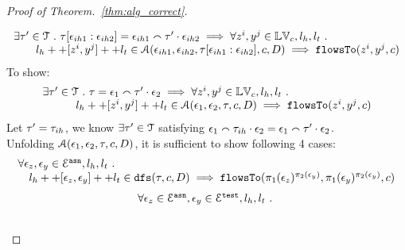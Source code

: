 \begin{proof}[Proof of Theorem.~\ref{thm:alg_correct}]
\begin{case}
\[\begin{array}{l}
   \exists \mathtt{\tau}' \in \mathcal{T} ~.~ 
   \mathtt{\tau}[\mathtt{\epsilon}_{ih1}:\mathtt{\epsilon}_{ih2}] = \mathtt{\epsilon}_{ih1} \smallfrown \mathtt{\tau}' \cdot \mathtt{\epsilon}_{ih2}
   \implies 
   \forall z^i, y^j \in \mathbb{LV}_c, l_h, l_t ~.~ 
    \\ \qquad 
   l_h ++ [z^i, y^j] ++ l_t  \in \mathcal{A}(\mathtt{\epsilon}_{ih1}, \mathtt{\epsilon}_{ih2}, \mathtt{\tau}[\mathtt{\epsilon}_{ih1}:\mathtt{\epsilon}_{ih2}], c, D)
   \implies \mathtt{flowsTo}(z^i, y^j, c)
\end{array}
\]
%
To show:
\[
\begin{array}{l}
    \exists \mathtt{\tau}' \in \mathcal{T} ~.~ \mathtt{\tau} = \mathtt{\epsilon}_1 \smallfrown \mathtt{\tau}' \cdot \mathtt{\epsilon}_2
   \implies \forall  z^i, y^j \in \mathbb{LV}_c, l_h, l_t ~.~
   \\ \quad \qquad 
   l_h ++ [z^i, y^j] ++ l_t \in \mathcal{A}(\mathtt{\epsilon}_1, \mathtt{\epsilon}_2, \mathtt{\tau}, c, D)
   \implies \mathtt{flowsTo}(z^i, y^j, c)  
\end{array}
\]
%
Let $\mathtt{\tau}' = \mathtt{\tau}_{ih}$, we know $\exists \mathtt{\tau}' \in \mathcal{T}$ satisfying 
$\mathtt{\epsilon}_1  {}\smallfrown \mathtt{\tau}_{ih} \cdot {} \mathtt{\epsilon}_2 = \mathtt{\epsilon}_1 \smallfrown \mathtt{\tau}' \cdot \mathtt{\epsilon}_2$.
\\
Unfolding $\mathcal{A}(\mathtt{\epsilon}_1, \mathtt{\epsilon}_2, \mathtt{\tau}, c, D)$, it is sufficient to show following 4 cases:
\begin{equation}
\begin{array}{l}
   \forall \mathtt{\epsilon}_z, \mathtt{\epsilon}_y \in \mathcal{E}^{\mathtt{{asn}}}, l_h, l_t ~.~ 
   \\ \quad 
   l_h ++ [\mathtt{\epsilon}_z, \mathtt{\epsilon}_y] ++ l_t \in \mathtt{dfs}(\mathtt{\tau}, c, D)
   \implies \mathtt{flowsTo}(\pi_1(\mathtt{\epsilon}_z)^{\pi_2(\mathtt{\epsilon}_y)}, \pi_1(\mathtt{\epsilon}_y)^{\pi_2(\mathtt{\epsilon}_y)}, c)
\end{array}
\end{equation}
%
\begin{equation}
\begin{array}{l}
  \forall \mathtt{\epsilon}_z \in \mathcal{E}^{\mathtt{{asn}}}, \mathtt{\epsilon}_y \in \mathcal{E}^{\mathtt{{test}}}, l_h, l_t ~.~
   \\ \quad 

\end{array}
\end{equation}
\end{case}
\end{proof}
